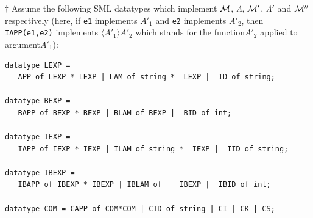 \documentclass[11pt]{article}
\begin{document}
$\dagger$ Assume the following SML  datatypes which implement ${\cal M}$, $\Lambda$, ${\cal M}'$, $\Lambda'$ and ${\cal M}''$ respectively (here, if \texttt{e1} implements $A'_1$ and \texttt{e2} implements $A'_2$, then 
 \texttt{IAPP(e1,e2)} implements $\langle A'_1\rangle A'_2$ which  stands for the function$A'_2$ applied to argument$A'_1$):
\begin{verbatim}
datatype LEXP =  
   APP of LEXP * LEXP | LAM of string *  LEXP |  ID of string;

datatype BEXP =  
   BAPP of BEXP * BEXP | BLAM of BEXP |  BID of int;

datatype IEXP =  
   IAPP of IEXP * IEXP | ILAM of string *  IEXP |  IID of string;

datatype IBEXP =  
   IBAPP of IBEXP * IBEXP | IBLAM of    IBEXP |  IBID of int;

datatype COM = CAPP of COM*COM | CID of string | CI | CK | CS;
\end{verbatim}
\end{document}
